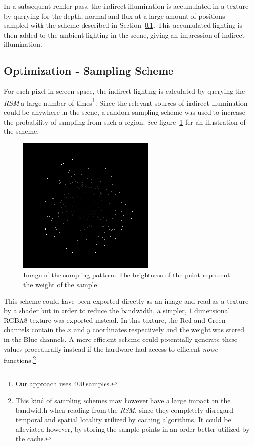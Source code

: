 \documentclass{acmsiggraph}               %
\begin{document}
In a subsequent render pass, the indirect illumination is accumulated in a texture by querying for the depth, normal and flux at a large amount of positions sampled with the scheme described in Section~\ref{sec:optrsm}. This accumulated lighting is then added to the ambient lighting in the scene, giving an impression of indirect illumination.

\subsection{Optimization - Sampling Scheme}
\label{sec:optrsm}
For each pixel in screen space, the indirect lighting is calculated by querying the \emph{RSM} a large number of times\footnote{Our approach uses $400$ samples.}. Since the relevant sources of indirect illumination could be anywhere in the scene, a random sampling scheme was used to increase the probability of sampling from such a region. See figure~\ref{fig:samp} for an illustration of the scheme.

\begin{figure}[tb]
    \centering
    \includegraphics[width=0.7\columnwidth]{./images/sampling.png}
    \caption{Image of the sampling pattern. The brightness of the point represent the weight of the sample.}
    \label{fig:samp}
\end{figure}

This scheme could have been exported directly as an image and read as a texture by a shader but in order to reduce the bandwidth, a simpler, $1$ dimensional RGBA8 texture was exported instead. In this texture, the Red and Green channels contain the $x$ and $y$ coordinates respectively and the weight was stored in the Blue channels. A more efficient scheme could potentially generate these values procedurally instead if the hardware had access to efficient \emph{noise} functions.\footnote{This kind of sampling schemes may however have a large impact on the bandwidth when reading from the \emph{RSM}, since they completely disregard temporal and spatial locality utilized by caching algorithms. It could be alleviated however, by storing the sample points in an order better utilized by the cache.}
\end{document}
